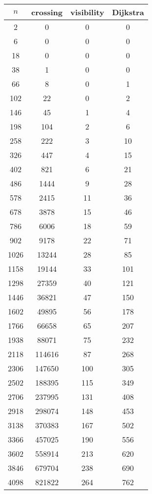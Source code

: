 \begin{table}[H]
\begin{tabular}{ |c|c|c|c| } 
 \hline
	$n$ & crossing & visibility & Dijkstra\\
	\hline
	2 & 0 & 0 & 0 \\
	\hline
	6 & 0 & 0 & 0 \\
	\hline
	18 & 0 & 0 & 0 \\
	\hline
	38 & 1 & 0 & 0 \\
	\hline
	66 & 8 & 0 & 1 \\
	\hline
	102 & 22 & 0 & 2 \\
	\hline
	146 & 45 & 1 & 4 \\
	\hline
	198 & 104 & 2 & 6 \\
	\hline
	258 & 222 & 3 & 10 \\
	\hline
	326 & 447 & 4 & 15 \\
	\hline
	402 & 821 & 6 & 21 \\
	\hline
	486 & 1444 & 9 & 28 \\
	\hline
	578 & 2415 & 11 & 36 \\
	\hline
	678 & 3878 & 15 & 46 \\
	\hline
	786 & 6006 & 18 & 59 \\
	\hline
	902 & 9178 & 22 & 71 \\
	\hline
	1026 & 13244 & 28 & 85 \\
	\hline
	1158 & 19144 & 33 & 101 \\
	\hline
	1298 & 27359 & 40 & 121 \\
	\hline
	1446 & 36821 & 47 & 150 \\
	\hline
	1602 & 49895 & 56 & 178 \\
	\hline
	1766 & 66658 & 65 & 207 \\
	\hline
	1938 & 88071 & 75 & 232 \\
	\hline
	2118 & 114616 & 87 & 268 \\
	\hline
	2306 & 147650 & 100 & 305 \\
	\hline
	2502 & 188395 & 115 & 349 \\
	\hline
	2706 & 237995 & 131 & 408 \\
	\hline
	2918 & 298074 & 148 & 453 \\
	\hline
	3138 & 370383 & 167 & 502 \\
	\hline
	3366 & 457025 & 190 & 556 \\
	\hline
3602 & 558914 & 213 & 620 \\
\hline
3846 & 679704 & 238 & 690 \\
\hline
4098 & 821822 & 264 & 762 \\

\end{tabular}
\end{table}
